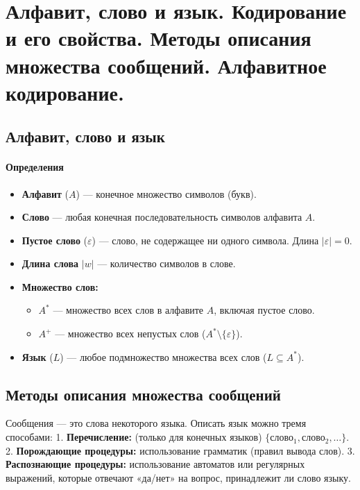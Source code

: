 \section{Алфавит, слово и язык. Кодирование и его свойства. Методы описания множества сообщений. Алфавитное кодирование.}

\subsection*{Алфавит, слово и язык}

\paragraph{Определения}
\begin{itemize}
    \item \textbf{Алфавит} ($A$) — конечное множество символов (букв).
    \item \textbf{Слово} — любая конечная последовательность символов алфавита $A$.
    \item \textbf{Пустое слово} ($\varepsilon$) — слово, не содержащее ни одного символа. Длина $| \varepsilon | = 0$.
    \item \textbf{Длина слова} $|w|$ — количество символов в слове.
    \item \textbf{Множество слов:}
    \begin{itemize}
        \item $A^*$ — множество всех слов в алфавите $A$, включая пустое слово.
        \item $A^+$ — множество всех непустых слов ($A^* \setminus \{ \varepsilon \}$).
    \end{itemize}
    \item \textbf{Язык} ($L$) — любое подмножество множества всех слов ($L \subseteq A^*$).
\end{itemize}

\subsection*{Методы описания множества сообщений}
Сообщения — это слова некоторого языка. Описать язык можно тремя способами:
1. \textbf{Перечисление:} (только для конечных языков) $\{ \text{слово}_1, \text{слово}_2, \dots \}$.
2. \textbf{Порождающие процедуры:} использование грамматик (правил вывода слов).
3. \textbf{Распознающие процедуры:} использование автоматов или регулярных выражений, которые отвечают «да/нет» на вопрос, принадлежит ли слово языку.


